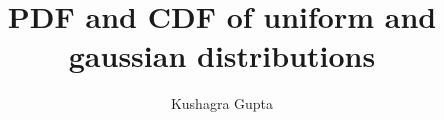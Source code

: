 \documentclass[journal,12pt,twocolumn]{IEEEtran}
\begin{document}
\theoremstyle{definition}
\newtheorem{theorem}{Theorem}[section]
\newtheorem{problem}{Problem}
\newtheorem{proposition}{Proposition}[section]
\newtheorem{lemma}{Lemma}[section]
\newtheorem{corollary}[theorem]{Corollary}
\newtheorem{example}{Example}[section]
\newtheorem{definition}{Definition}[section]
\newcommand{\BEQA}{\begin{eqnarray}}
\newcommand{\EEQA}{\end{eqnarray}}
\newcommand{\define}{\stackrel{\triangle}{=}}

%
\providecommand{\nCr}[2]{\,^{#1}C_{#2}} %
\providecommand{\nPr}[2]{\,^{#1}P_{#2}} %
\providecommand{\mbf}{\mathbf}
\providecommand{\pr}[1]{\ensuremath{\Pr\left(#1\right)}}
\providecommand{\qfunc}[1]{\ensuremath{Q\left(#1\right)}}
\providecommand{\sbrak}[1]{\ensuremath{{}\left[#1\right]}}
\providecommand{\lsbrak}[1]{\ensuremath{{}\left[#1\right.}}
\providecommand{\rsbrak}[1]{\ensuremath{{}\left.#1\right]}}
\providecommand{\brak}[1]{\ensuremath{\left(#1\right)}}
\providecommand{\lbrak}[1]{\ensuremath{\left(#1\right.}}
\providecommand{\rbrak}[1]{\ensuremath{\left.#1\right)}}
\providecommand{\cbrak}[1]{\ensuremath{\left\{#1\right\}}}
\providecommand{\lcbrak}[1]{\ensuremath{\left\{#1\right.}}
\providecommand{\rcbrak}[1]{\ensuremath{\left.#1\right\}}}
\theoremstyle{remark}
\newtheorem{rem}{Remark}
\newcommand{\sgn}{\mathop{\mathrm{sgn}}}
\providecommand{\abs}[1]{\left\vert#1\right\vert}
\providecommand{\res}[1]{\Res\displaylimits_{#1}} 
\providecommand{\norm}[1]{\left\Vert#1\right\Vert}
\providecommand{\mtx}[1]{\mathbf{#1}}
\providecommand{\mean}[1]{E\left[ #1 \right]}
\providecommand{\fourier}{\overset{\mathcal{F}}{ \rightleftharpoons}}
\providecommand{\system}{\overset{\mathcal{H}}{ \longleftrightarrow}}
\newcommand{\solution}{\noindent \textbf{Solution: }}
\newcommand{\myvec}[1]{\ensuremath{\begin{pmatrix}#1\end{pmatrix}}}
\providecommand{\dec}[2]{\ensuremath{\overset{#1}{\underset{#2}{\gtrless}}}}
\DeclarePairedDelimiter{\ceil}{\lceil}{\rceil}
\makeatletter
{}
\makeatother
\let\StandardTheFigure\thefigure
\renewcommand{\thefigure}{\thesection}
\makeatletter
{}
\makeatother
\let\StandardTheFigure\thefigure
\let\StandardTheTable\thetable
\let\vec\mathbf
{}%
\providecommand{\pr}[1]{\ensuremath{\Pr\left(#1\right)}}
\providecommand{\sbrak}[1]{\ensuremath{{}\left[#1\right]}}
\providecommand{\brak}[1]{\ensuremath{\left(#1\right)}}
\title{PDF and CDF of uniform and gaussian distributions}
\author{Kushagra Gupta}
\end{document}
